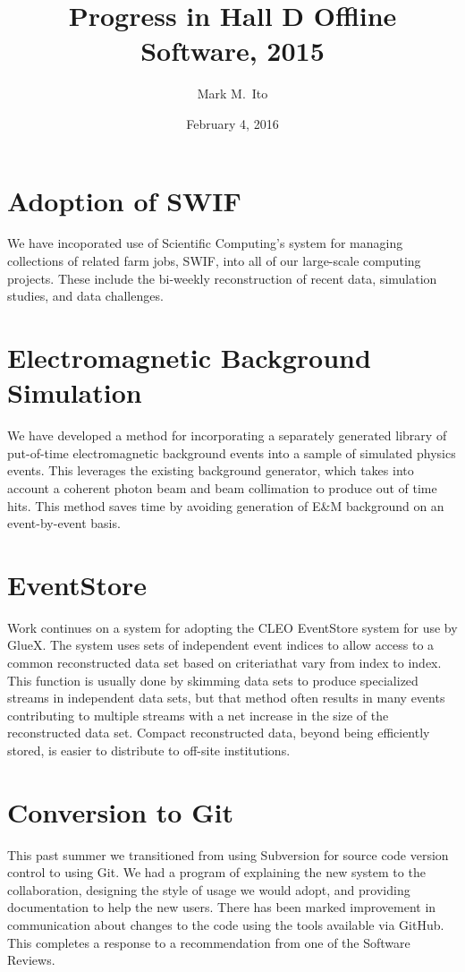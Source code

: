\documentclass[12pt]{article}
\title{Progress in Hall D Offline Software, 2015}
\author{Mark M.\ Ito}
\date{February 4, 2016}
\begin{document}
\maketitle

\section{Adoption of SWIF}

We have incoporated use of Scientific Computing's system for managing
collections of related farm jobs, SWIF, into all of our large-scale
computing projects. These include the bi-weekly reconstruction of
recent data, simulation studies, and data challenges.

\section{Electromagnetic Background Simulation}

We have developed a method for incorporating a separately generated
library of put-of-time electromagnetic background events into a sample
of simulated physics events. This leverages the existing background
generator, which takes into account a coherent photon beam and beam
collimation to produce out of time hits. This method saves time by
avoiding generation of E\&M background on an event-by-event basis.

\section{EventStore}

Work continues on a system for adopting the CLEO EventStore system for
use by GlueX. The system uses sets of independent event indices to
allow access to a common reconstructed data set based on criteriathat
vary from index to index. This function is usually done by skimming
data sets to produce specialized streams in independent data sets, but
that method often results in many events contributing to multiple
streams with a net increase in the size of the reconstructed data
set. Compact reconstructed data, beyond being efficiently stored, is
easier to distribute to off-site institutions.

\section{Conversion to Git}

This past summer we transitioned from using Subversion for source code
version control to using Git. We had a program of explaining the new
system to the collaboration, designing the style of usage we would
adopt, and providing documentation to help the new users. There has
been marked improvement in communication about changes to the code
using the tools available via GitHub. This completes a response to a
recommendation from one of the Software Reviews.
\end{document}
